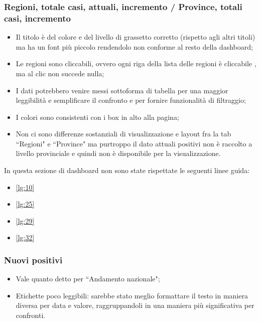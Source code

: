 \subsubsection{Regioni, totale casi, attuali, incremento / Province, totali casi, incremento}
\begin{itemize}
    \item Il titolo è del colore e del livello di grassetto corretto (rispetto agli altri titoli) ma ha un font più piccolo rendendolo non conforme al resto della dashboard;
    \item Le regioni sono cliccabili, ovvero ogni riga della lista delle regioni è cliccabile , ma al clic non succede nulla;
    \item I dati potrebbero venire messi sottoforma di tabella  per una maggior leggibilità e semplificare il confronto e per fornire funzionalità di filtraggio;
    \item I colori sono consistenti con i box in alto alla pagina;
    \item Non ci sono differenze sostanziali di visualizzazione e layout fra la tab ``Regioni" e ``Province" ma purtroppo il dato attuali positivi non è raccolto a livello provinciale e quindi non è disponibile per la visualizzazione.
\end{itemize}
In questa sezione di dashboard non sono state rispettate le seguenti linee guida:
\begin{itemize}
    \item \ref{lg:10}
    \item \ref{lg:25}
    \item \ref{lg:29}
    \item \ref{lg:32}
\end{itemize}
\subsubsection{Nuovi positivi}
\begin{itemize}
        \item Vale quanto detto per ``Andamento nazionale";
        \item Etichette poco leggibili: sarebbe stato meglio formattare il testo in maniera diversa per data e valore, raggruppandoli in una maniera più significativa per confronti.
\end{itemize}

